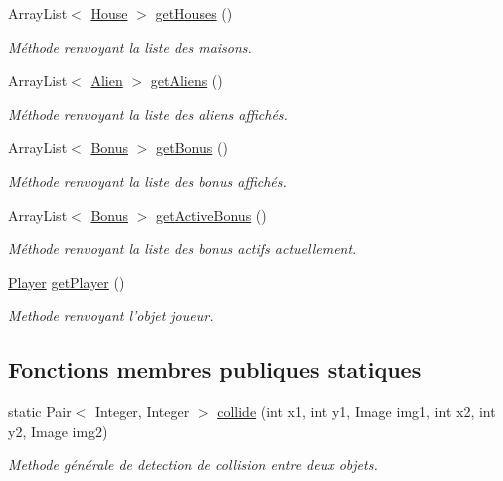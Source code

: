 \begin{DoxyCompactItemize}
Array\-List$<$ \hyperlink{class_house}{House} $>$ \hyperlink{class_motor_af1d6924fafe1e9d2ce3c77799c35a136}{get\-Houses} ()
\begin{DoxyCompactList}\small\item\em Méthode renvoyant la liste des maisons. \end{DoxyCompactList}\item 
Array\-List$<$ \hyperlink{class_alien}{Alien} $>$ \hyperlink{class_motor_a787633e0544ca8c8dceb3f415b7aeeea}{get\-Aliens} ()
\begin{DoxyCompactList}\small\item\em Méthode renvoyant la liste des aliens affichés. \end{DoxyCompactList}\item 
Array\-List$<$ \hyperlink{class_bonus}{Bonus} $>$ \hyperlink{class_motor_a42d5acc1b6be21bade008a427bef9c64}{get\-Bonus} ()
\begin{DoxyCompactList}\small\item\em Méthode renvoyant la liste des bonus affichés. \end{DoxyCompactList}\item 
Array\-List$<$ \hyperlink{class_bonus}{Bonus} $>$ \hyperlink{class_motor_a33b87f33f275b9f87ed7791857af2cf3}{get\-Active\-Bonus} ()
\begin{DoxyCompactList}\small\item\em Méthode renvoyant la liste des bonus actifs actuellement. \end{DoxyCompactList}\item 
\hyperlink{class_player}{Player} \hyperlink{class_motor_a054f1e6ac323e78270bcb2ed9687fb80}{get\-Player} ()
\begin{DoxyCompactList}\small\item\em Methode renvoyant l'objet joueur. \end{DoxyCompactList}\end{DoxyCompactItemize}
\subsection*{Fonctions membres publiques statiques}
\begin{DoxyCompactItemize}
\item 
static Pair$<$ Integer, Integer $>$ \hyperlink{class_motor_a810690068c5edddd73d584e0dd19acd4}{collide} (int x1, int y1, Image img1, int x2, int y2, Image img2)
\begin{DoxyCompactList}\small\item\em Methode générale de detection de collision entre deux objets. \end{DoxyCompactList}\end{DoxyCompactItemize}


